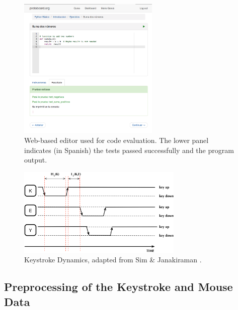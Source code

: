 \documentclass[a4paper,twoside]{article}
\begin{document}
\begin{figure}[h!tb]
\centering
\includegraphics[width=0.60\textwidth]{editorRresult.png}
\caption{Web-based editor used for code evaluation. The lower panel
  indicates (in Spanish) the tests passed successfully and the program
  output.}
\label{fig_editor}
\end{figure}

\begin{figure}[h!tb]
\centering
\includegraphics[width=0.70\textwidth]{KeyDyn.png}
\caption{Keystroke Dynamics, adapted from Sim \& Janakiraman \cite{sim2007digraphs}.}
\label{figKD}
\end{figure}

\subsection{Preprocessing of the Keystroke and Mouse Data}
\end{document}
